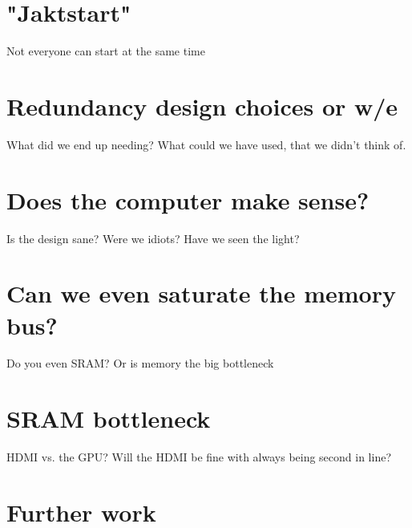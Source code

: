 \documentclass[../main/report.tex]{subfiles}
\begin{document}


\section{"Jaktstart"}

Not everyone can start at the same time

\section{Redundancy design choices or w/e}
What did we end up needing?
What could we have used, that we didn't think of.

\section{Does the computer make sense?}
Is the design sane?
Were we idiots?
Have we seen the light?

\section{Can we even saturate the memory bus?}
Do you even SRAM?
Or is memory the big bottleneck

\section{SRAM bottleneck}
HDMI vs. the GPU?
Will the HDMI be fine with always being second in line?



\section{Further work}

\end{document}
